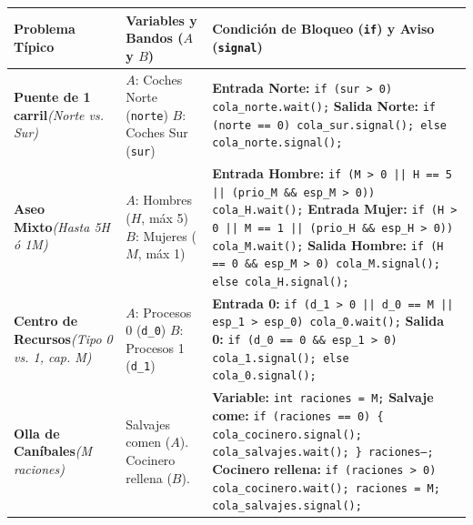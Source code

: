 \documentclass[11pt,a4paper]{article}
\begin{document}
\begin{table}[h!]
\centering\footnotesize
\renewcommand{\arraystretch}{1.2}
\begin{tabular}{p{3.2cm}p{4.6cm}p{8cm}}
\toprule
\textbf{Problema Típico} & \textbf{Variables y Bandos ($A$ y $B$)} & \textbf{Condición de Bloqueo (\texttt{if}) y Aviso (\texttt{signal})} \\
\midrule
\textbf{Puente de 1 carril}\newline \textit{(Norte vs. Sur)} & 
$A$: Coches Norte (\texttt{norte})\newline
$B$: Coches Sur (\texttt{sur}) & 
\textbf{Entrada Norte:} \texttt{if (sur > 0) cola\_norte.wait();}\newline
\textbf{Salida Norte:} \texttt{if (norte == 0) cola\_sur.signal(); else cola\_norte.signal();} \\
\midrule
\textbf{Aseo Mixto}\newline \textit{(Hasta 5H ó 1M)} & 
$A$: Hombres ($H$, máx 5)\newline
$B$: Mujeres ($M$, máx 1) & 
\textbf{Entrada Hombre:} \texttt{if (M > 0 || H == 5 || (prio\_M \&\& esp\_M > 0)) cola\_H.wait();}\newline
\textbf{Entrada Mujer:} \texttt{if (H > 0 || M == 1 || (prio\_H \&\& esp\_H > 0)) cola\_M.wait();}\newline
\textbf{Salida Hombre:} \texttt{if (H == 0 \&\& esp\_M > 0) cola\_M.signal(); else cola\_H.signal();} \\
\midrule
\textbf{Centro de Recursos}\newline \textit{(Tipo 0 vs. 1, cap. M)} & 
$A$: Procesos 0 (\texttt{d\_0})\newline
$B$: Procesos 1 (\texttt{d\_1}) & 
\textbf{Entrada 0:} \texttt{if (d\_1 > 0 || d\_0 == M || esp\_1 > esp\_0) cola\_0.wait();}\newline
\textbf{Salida 0:} \texttt{if (d\_0 == 0 \&\& esp\_1 > 0) cola\_1.signal(); else cola\_0.signal();} \\
\midrule
\textbf{Olla de Caníbales}\newline \textit{(M raciones)} & 
Salvajes comen ($A$).\newline
Cocinero rellena ($B$). & 
\textbf{Variable:} \texttt{int raciones = M;}\newline
\textbf{Salvaje come:} \texttt{if (raciones == 0) \{ cola\_cocinero.signal(); cola\_salvajes.wait(); \} raciones--;}\newline
\textbf{Cocinero rellena:} \texttt{if (raciones > 0) cola\_cocinero.wait(); raciones = M; cola\_salvajes.signal();} \\

\end{tabular}
\end{table}
\end{document}
